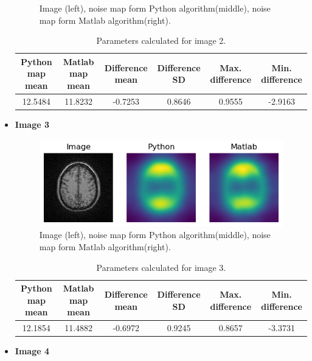 \begin{itemize}
\begin{figure}[H]
		\caption{Image (left), noise map form Python algorithm(middle), noise map form Matlab algorithm(right).} 
\end{figure}
\begin{table}[H]
\caption{\label{tab:table-name}Parameters calculated for image 2.}
	\begin{center}
		\begin{tabular}{ |c|c|c|c|c|c| } 
 			\hline
 			\textbf{Python map mean} & \textbf{Matlab map mean} & \textbf{Difference mean} & \textbf{Difference SD} & \textbf{Max. difference} & 					\textbf{Min. difference} \\ 
			\hline
 			12.5484 & 11.8232 & -0.7253 & 0.8646 & 0.9555 & -2.9163 \\ 
			\hline
		\end{tabular}
	\end{center}
\end{table}
\item \textbf{Image 3}
\begin{figure}[H]
	\centering
	\captionsetup{justification=centering}
		\includegraphics[scale=0.7]{figures/module03/110_comp}
		\caption{Image (left), noise map form Python algorithm(middle), noise map form Matlab algorithm(right).} 
\end{figure}
\begin{table}[H]
\caption{\label{tab:table-name}Parameters calculated for image 3.}
	\begin{center}
		\begin{tabular}{ |c|c|c|c|c|c| } 
 			\hline
 			\textbf{Python map mean} & \textbf{Matlab map mean} & \textbf{Difference mean} & \textbf{Difference SD} & \textbf{Max. difference} & 					\textbf{Min. difference} \\ 
			\hline
 			12.1854 & 11.4882 & -0.6972 & 0.9245 & 0.8657 & -3.3731 \\ 
			\hline
		\end{tabular}
	\end{center}
\end{table}
\item \textbf{Image 4}

\end{itemize}
